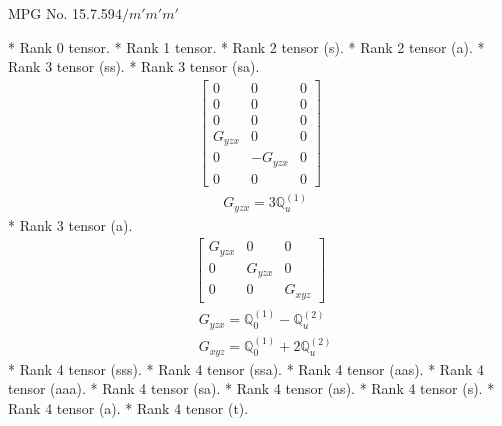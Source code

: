 \documentclass[fleqn,8pt,landscape]{jsarticle}
\begin{document}
\setcounter{MaxMatrixCols}{32}

\renewcommand{\tablename}{Table~}
\renewcommand{\figurename}{Figure~}
\begin{center}
\LARGE
MPG No. 15.7.59\quad$4/m'm'm'$
\end{center}
* Rank 0 tensor.
* Rank 1 tensor.
* Rank 2 tensor (s).
* Rank 2 tensor (a).
* Rank 3 tensor (ss).
* Rank 3 tensor (sa).
\begin{align*}
\begin{bmatrix} 0 & 0 & 0 \\ 0 & 0 & 0 \\ 0 & 0 & 0 \\ G_{yzx} & 0 & 0 \\ 0 & - G_{yzx} & 0 \\ 0 & 0 & 0 \end{bmatrix}
\end{align*}
\begin{align*}
& G_{yzx} = 3 \mathbb{Q}_{u}^{(1)}
\end{align*}
* Rank 3 tensor (a).
\begin{align*}
\begin{bmatrix} G_{yzx} & 0 & 0 \\ 0 & G_{yzx} & 0 \\ 0 & 0 & G_{xyz} \end{bmatrix}
\end{align*}
\begin{align*}
& G_{yzx} = \mathbb{Q}_{0}^{(1)} - \mathbb{Q}_{u}^{(2)} \\
& G_{xyz} = \mathbb{Q}_{0}^{(1)} + 2 \mathbb{Q}_{u}^{(2)}
\end{align*}
* Rank 4 tensor (sss).
* Rank 4 tensor (ssa).
* Rank 4 tensor (aas).
* Rank 4 tensor (aaa).
* Rank 4 tensor (sa).
* Rank 4 tensor (as).
* Rank 4 tensor (s).
* Rank 4 tensor (a).
* Rank 4 tensor (t).
\end{document}
